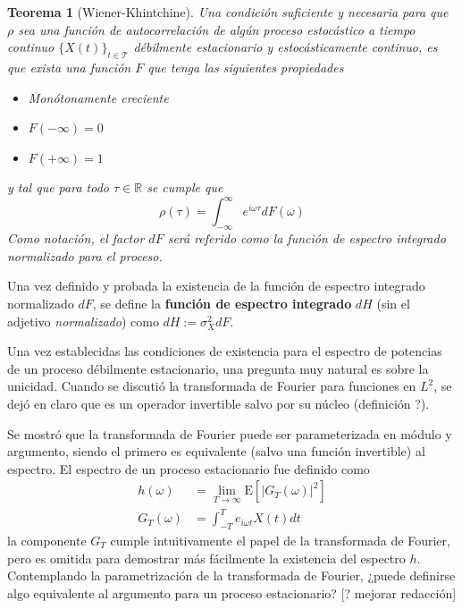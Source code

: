 \documentclass[12pt,letterpaper,draft]{book}
\newtheorem{teorema}{Teorema}[chapter]
\newcommand{\R}{\mathbb{R}}
\newcommand{\intR}{\int_{-\infty}^{\infty}}
\newcommand{\E}[1]{\mathrm{E}\left[ #1 \right]}
\newcommand{\abso}[1]{\left| #1 \right|}
\newcommand{\xt}{$\{X(t)\}_{t\in \mathcal{T}}$ }
\begin{document}
\begin{teorema}[Wiener-Khintchine]
Una condición suficiente y necesaria para que $\rho$ sea una función de autocorrelación de algún proceso estocástico a tiempo continuo \xt débilmente estacionario y estocásticamente continuo, es que exista una función $F$ que tenga las siguientes propiedades
\begin{itemize}
\item Monótonamente creciente
\item $F(-\infty) = 0$
\item $F(+\infty) = 1$
\end{itemize}
y tal que para todo $\tau \in \R$ se cumple que
\begin{equation*}
\rho(\tau) = \intR e^{i \omega \tau} dF(\omega)
\end{equation*}
Como notación, el factor $dF$ será referido como la \textit{función de espectro integrado normalizado} para el proceso.
\label{t_wienerkhinchin}
\end{teorema}

Una vez definido y probada la existencia de la función de espectro integrado normalizado $dF$, se define la \textbf{función de espectro integrado} $dH$ (sin el adjetivo \textit{normalizado}) como
$dH := \sigma_X^{2} dF$.


Una vez establecidas las condiciones de existencia para el espectro de potencias de un proceso débilmente estacionario, una pregunta muy natural es sobre la unicidad.
%
Cuando se discutió la transformada de Fourier para funciones en $L^{2}$, se dejó en claro que es un operador invertible salvo por su núcleo (definición ?).

Se mostró que la transformada de Fourier puede ser parameterizada en módulo y argumento, siendo el primero es equivalente (salvo una función invertible) al espectro.
%
El espectro de un proceso estacionario fue definido como
\begin{align*}
h(\omega) &= \lim_{T\rightarrow\infty} \E{\abso{ G_T(\omega)}^{2}} \\
G_T(\omega) &= \int_{-T}^{T} e_{i \omega t} X(t) dt
\end{align*}
la componente $G_T$ cumple intuitivamente el papel de la transformada de Fourier, pero es omitida para demostrar más fácilmente la existencia del espectro $h$. Contemplando la parametrización de la transformada de Fourier, ¿puede definirse algo equivalente al argumento para un proceso estacionario?
%
[? mejorar redacción]
\end{document}
